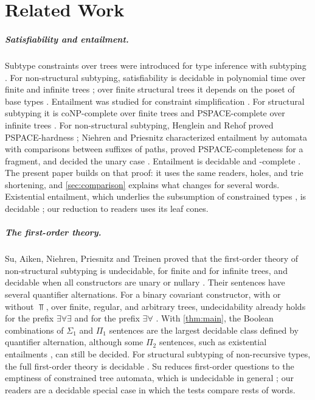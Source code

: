 \section{Related Work}
\label{sec:related}

\subparagraph*{Satisfiability and entailment.}
Subtype constraints over trees were introduced for type inference with subtyping
\cite{Mitchell91,FuhMishra90}. For non-structural subtyping, satisfiability is decidable in
polynomial time over finite and infinite trees
\cite{KozenPalsbergSchwartzbach94,PalsbergOKeefe95,PalsbergWandOKeefe97}; over finite
structural trees it depends on the poset of base types
\cite{Tiuryn92,PrattTiuryn96,Frey97,NiehrenPriesnitzSu05}. Entailment was studied for
constraint simplification \cite{Pottier96,TrifonovSmith96,Rehof97,Pottier01}. For structural
subtyping it is coNP-complete over finite trees and PSPACE-complete over infinite trees
\cite{HengleinRehof97,HengleinRehof98}. For non-structural subtyping, Henglein and Rehof
proved PSPACE-hardness \cite{HengleinRehof98}; Niehren and Priesnitz characterized
entailment by automata with comparisons between suffixes of paths, proved
PSPACE-completeness for a fragment, and decided the unary case
\cite{NiehrenPriesnitz99,NiehrenPriesnitz03}. Entailment is decidable and
\coNExp-complete \cite{NSSE26}. The present paper builds on that proof: it uses the same
readers, holes, and trie shortening, and \cref{sec:comparison} explains what changes for
several words. Existential entailment, which underlies the subsumption of constrained types
\cite{TrifonovSmith96}, is decidable \cite{Zhao26E}; our reduction to readers uses its leaf
cones.

\subparagraph*{The first-order theory.}
Su, Aiken, Niehren, Priesnitz and Treinen proved that the first-order theory of
non-structural subtyping is undecidable, for finite and for infinite trees, and decidable
when all constructors are unary or nullary \cite{SuAikenNiehrenPriesnitzTreinen02,SuEtAl06}.
Their sentences have several quantifier alternations. For a binary covariant constructor,
with or without $\Top$, over finite, regular, and arbitrary trees, undecidability already
holds for the prefix $\exists\forall\exists$ \cite{Zhao26U} and for the prefix
$\exists\forall$ \cite{Zhao26S2}. With \cref{thm:main}, the Boolean combinations of
$\Sigma_1$ and $\Pi_1$ sentences are the largest decidable class defined by quantifier
alternation, although some $\Pi_2$ sentences, such as existential entailments
\cite{Zhao26E}, can still be decided. For
structural subtyping of non-recursive types, the full first-order theory is decidable
\cite{KuncakRinard03}. Su \cite{Su02} reduces first-order questions to the emptiness of
constrained tree automata, which is undecidable in general \cite{Treinen00}; our readers are
a decidable special case in which the tests compare rests of words.

